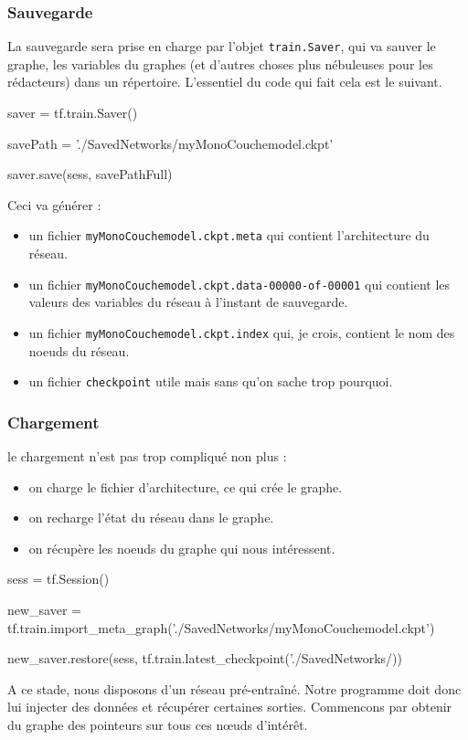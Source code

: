 \documentclass[a4paper,11pt]{book}
\begin{document}
\subsubsection{Sauvegarde}
La sauvegarde sera prise en charge par l'objet \verb+train.Saver+, qui va sauver le graphe, les variables du graphes (et d'autres choses plus nébuleuses pour les rédacteurs) dans un répertoire.
L'essentiel du code qui fait cela est le suivant.
\begin{mypython}
saver = tf.train.Saver()

savePath = './SavedNetworks/myMonoCouchemodel.ckpt'

saver.save(sess, savePathFull)  
\end{mypython}
Ceci va générer :
\begin{itemize}
\item un fichier \verb+myMonoCouchemodel.ckpt.meta+ qui contient l'architecture du réseau.
\item un fichier \verb+myMonoCouchemodel.ckpt.data-00000-of-00001+ qui contient les valeurs des variables du réseau à l'instant de sauvegarde.
\item un fichier \verb+myMonoCouchemodel.ckpt.index+ qui, je crois, contient le nom des noeuds du réseau.
\item un fichier \verb+checkpoint+ utile mais sans qu'on sache trop pourquoi.
\end{itemize}

\subsubsection{Chargement}
le chargement n'est pas trop compliqué non plus :
\begin{itemize}
\item on charge le fichier d'architecture, ce qui crée le graphe.
\item on recharge l'état du réseau dans le graphe.
\item on récupère les noeuds du graphe qui nous intéressent.
\end{itemize}
\begin{mypython}

sess = tf.Session()

new_saver = tf.train.import_meta_graph('./SavedNetworks/myMonoCouchemodel.ckpt')
  
new_saver.restore(sess, tf.train.latest_checkpoint('./SavedNetworks/))
\end{mypython}
A ce stade, nous disposons d'un réseau pré-entraîné.
Notre programme doit donc lui injecter des données et récupérer certaines sorties. Commencons par obtenir du graphe des pointeurs sur tous ces nœuds d'intérêt.
\end{document}
